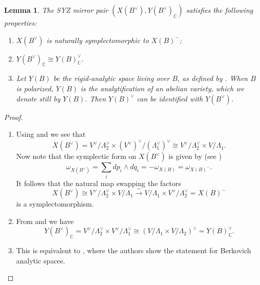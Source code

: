 \documentclass[10pt]{amsart}
\newtheorem{lem}[thm]{Lemma}
\theoremstyle{definition}
\theoremstyle{remark}
\def\C{\mathbb{C}}
\newcommand{\wdg}{\wedge}
\def\x{\times}
\newcommand{\xra}[1]{\xrightarrow{#1}}
\begin{document}
\begin{lem}\label{lem:SYZ_dual}
    The SYZ mirror pair $(X(B^\vee),Y(B^\vee)_\C)$ satisfies the following properties:
    \begin{enumerate}
        \item $X(B^\vee)$ is naturally symplectomorphic to $X(B)^-$;
        \item $Y(B^\vee)_\C\cong Y(B)^\vee_\C$.
        \item Let $Y(B)$ be the rigid-analytic space living over $B$, as defined by \cite{kontsevich2006affine}. When $B$ is polarized, $Y(B)$ is the analytification of an abelian variety, which we denote still by $Y(B)$. Then $Y(B)^\vee$ can be identified with $Y(B^\vee)$.
    \end{enumerate}
\end{lem}
\begin{proof}
    \begin{enumerate}
        \item Using  and  we see that
        $$
        X(B^\vee) 
        = 
        V^\vee/\Lambda_2^\vee \x (V^\vee)^\vee/(\Lambda_1^\vee)^\vee 
        \cong
        V^\vee/\Lambda_2^\vee \x V/\Lambda_1.
$$
        Now note that the symplectic form on $X(B^\vee)$ is given by (see )
        $$
            \omega_{X(B^\vee)} = \sum_i dp_i \wdg dq_i = -\omega_{X(B)} = \omega_{X(B)^-}.
        $$
        It follows that the natural map swapping the factors
        $$
            X(B^\vee) \cong V^\vee/\Lambda_2^\vee \x V/\Lambda_1 \xra{\sim} V/\Lambda_1 \x V^\vee/\Lambda_2^\vee = X(B)^-
        $$
        is a symplectomorphism.
        \item From  and  we have
        $$
        Y(B^\vee)_\C = V^\vee/\Lambda_2^\vee \x V^\vee/\Lambda_1^\vee \cong (V/\Lambda_1 \x V/\Lambda_2)^\vee = Y(B)^\vee_\C. 
        $$
        \item This is equivalent to \cite[Proposition 4.7]{foster2018non}, where the authors show the statement for Berkovich analytic spaces.
    \end{enumerate}
\end{proof}
\end{document}
